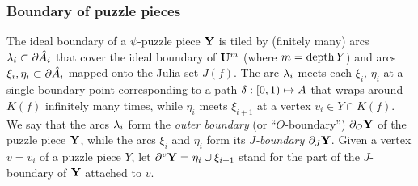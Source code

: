 
\subsubsection{Boundary of puzzle pieces}\label{boundary}
The ideal boundary of a $\psi$-puzzle piece ${\mathbf{Y}}$
is tiled by (finitely many) arcs $\lambda_i\subset \partial \hat A_i$
that cover the ideal boundary of ${\mathbf{U}}^m$ (where $m=\operatorname{depth} Y$) 
and arcs $\xi_i, \eta_i \subset \partial \hat A_i$ mapped onto the Julia set $J(f)$. 
The arc ${\lambda}_i$ meets each $\xi_i,\, \eta_i$ at a single boundary point
corresponding to a path ${\delta}: [0,1)\mapsto A$ that wraps around $K(f)$ infinitely many times,
while $\eta_i$ meets $\xi_{i+1}$ at a vertex $v_i\in Y\cap K(f)$. 
We say  that the arcs ${\lambda}_i$ form the {\it outer boundary } (or ``$O$-boundary'')
 $\partial_O{\mathbf{Y}}$ of the puzzle piece ${\mathbf{Y}}$,
while the arcs $\xi_i$ and $\eta_i$
form its {\it $J$-boundary} $\partial_J {\mathbf{Y}}$. 
Given a vertex $v=v_i$ of a puzzle piece $Y$, let $\partial^v{\mathbf{Y}}=\eta_i\cup \xi_{i+1}$ 
stand for the part of the $J$-boundary of ${\mathbf{Y}}$ attached to $v$.


